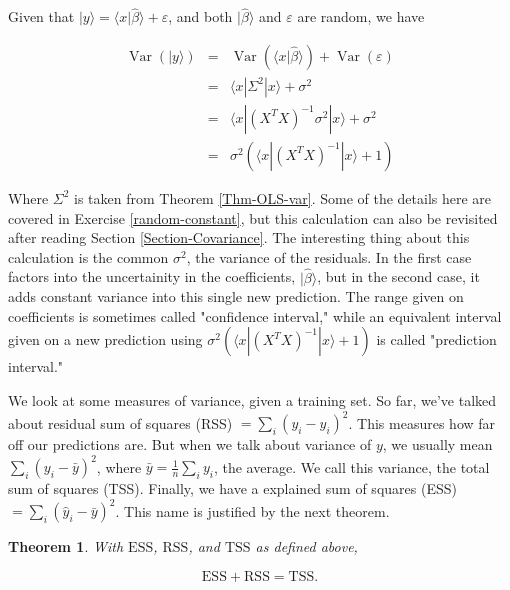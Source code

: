 \documentclass{amsbook}
\newtheorem{theorem}{Theorem}
\begin{document}
Given that $|y\rangle=\langle x|\hat\beta\rangle+\varepsilon$, and both $|\hat\beta\rangle$ and $\varepsilon$ are random, we have

$$
\begin{array}{rcl}
\operatorname{Var}\left(|y\rangle\right) &=& \operatorname{Var}\left(\langle x|\hat\beta\rangle\right) + \operatorname{Var}(\varepsilon) \\
&=& \langle x|\Sigma^2|x\rangle + \sigma^2 \\
&=& \langle x|\left(X^TX\right)^{-1}\sigma^2|x\rangle + \sigma^2 \\
&=& \sigma^2\left(\langle x|\left(X^TX\right)^{-1}|x\rangle + 1\right)
\end{array}
$$

Where $\Sigma^2$ is taken from Theorem \ref{Thm-OLS-var}.  Some of the details here are covered in Exercise \ref{random-constant}, but this calculation can also be revisited after reading Section \ref{Section-Covariance}.  The interesting thing about this calculation is the common $\sigma^2$, the variance of the residuals.  In the first case factors into the uncertainity in the coefficients, $|\hat\beta\rangle$, but in the second case, it adds constant variance into this single new prediction.  The range given on coefficients is sometimes called "confidence interval," while an equivalent interval given on a new prediction using $\sigma^2\left(\langle x|\left(X^TX\right)^{-1}|x\rangle + 1\right)$ is called "prediction interval."

We look at some measures of variance, given a training set.  So far, we've talked about residual sum of squares (RSS) $=\sum_i\left(y_i-\hat y_i\right)^2$.  This measures how far off our predictions are.  But when we talk about variance of $y$, we usually mean $\sum_i\left(y_i-\bar y\right)^2$, where $\bar y=\frac{1}{n}\sum_i y_i$, the average.  We call this variance, the total sum of squares (TSS).  Finally, we have a explained sum of squares (ESS) $=\sum_i\left(\hat y_i-\bar y\right)^2$.  This name is justified by the next theorem.

\begin{theorem}
With $\text{ESS}$, $\text{RSS}$, and $\text{TSS}$ as defined above,

$$
\text{ESS}+\text{RSS}=\text{TSS}.
$$
\end{theorem}
\end{document}
